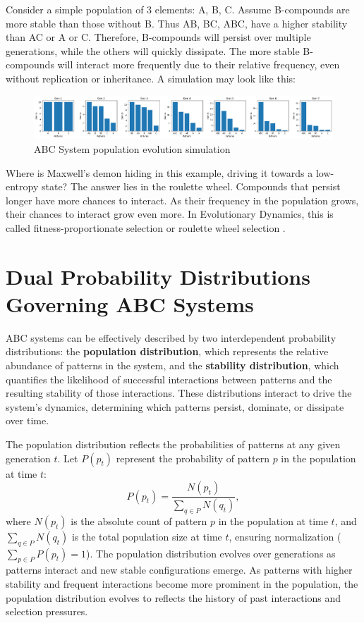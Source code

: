 \documentclass[entropy,article,submit,pdftex,moreauthors]{Definitions/mdpi}
\begin{document}
Consider a simple population of 3 elements: {A, B, C}. Assume B-compounds are more stable than those without B. Thus AB, BC, ABC, have a higher stability than AC or A or C. Therefore, B-compounds will persist over multiple generations, while the others will quickly dissipate. The more stable B-compounds will interact more frequently due to their relative frequency, even without replication or inheritance. A simulation may look like this:

\begin{figure}[htp]
    \centering
    \includegraphics[width=13cm]{pat_1}
    \caption{ABC System population evolution simulation}
    \label{fig:pat_1}
\end{figure}

Where is Maxwell's demon \cite{leff2002maxwell} hiding in this example, driving it towards a low-entropy state? The answer lies in the roulette wheel. Compounds that persist longer have more chances to interact. As their frequency in the population grows, their chances to interact grow even more. In Evolutionary Dynamics, this is called fitness-proportionate selection \cite{back1996evolutionary} or roulette wheel selection \cite{goldberg1989genetic} \cite{holland1975adaptation}.

\section{Dual Probability Distributions Governing ABC Systems}

ABC systems can be effectively described by two interdependent probability distributions: the \textbf{population distribution}, which represents the relative abundance of patterns in the system, and the \textbf{stability distribution}, which quantifies the likelihood of successful interactions between patterns and the resulting stability of those interactions. These distributions interact to drive the system's dynamics, determining which patterns persist, dominate, or dissipate over time.

The population distribution reflects the probabilities of patterns at any given generation \( t \). Let \( P(p_t) \) represent the probability of pattern \( p \) in the population at time \( t \):
\[
P(p_t) = \frac{N(p_t)}{\sum_{q \in P} N(q_t)},
\]
where \( N(p_t) \) is the absolute count of pattern \( p \) in the population at time \( t \), and \( \sum_{q \in P} N(q_t) \) is the total population size at time \( t \), ensuring normalization (\( \sum_{p \in P} P(p_t) = 1 \)). The population distribution evolves over generations as patterns interact and new stable configurations emerge. As patterns with higher stability and frequent interactions become more prominent in the population, the population distribution evolves to reflects the history of past interactions and selection pressures.
\end{document}
